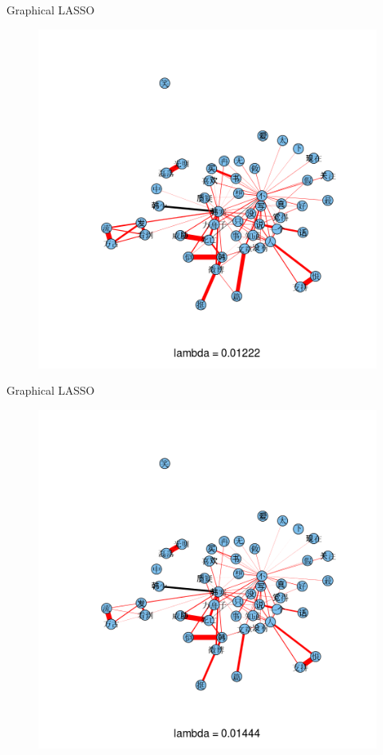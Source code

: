 \documentclass[12pt, trans]{beamer}
\newcommand{\1}[1]{{\mathbf 1}\left\{#1\right\}}        %
\begin{document}
\begin{frame}{Graphical LASSO}

\begin{figure}
  \centering
  \includegraphics[height=0.9\textheight]{./../../gLassoResults/glasso2.png} 
\end{figure}

\end{frame}
\begin{frame}{Graphical LASSO}

\begin{figure}
  \centering
  \includegraphics[height=0.9\textheight]{./../../gLassoResults/glasso3.png} 
\end{figure}

\end{frame}
\end{document}
